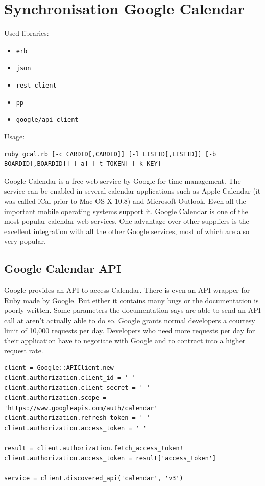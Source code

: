 \section{Synchronisation Google Calendar}
Used libraries:
\begin{itemize}
	\item \texttt{erb}
	\item \texttt{json}
	\item \texttt{rest\_client}
	\item \texttt{pp}
	\item \texttt{google/api\_client}
\end{itemize}

Usage:
\begin{lstlisting}[aboveskip=1\baselineskip, style=bash, caption=\texttt{gcal.rb} usage., label=listing025]
ruby gcal.rb [-c CARDID[,CARDID]] [-l LISTID[,LISTID]] [-b BOARDID[,BOARDID]] [-a] [-t TOKEN] [-k KEY]
\end{lstlisting}

Google Calendar is a free web service by Google for time-management. The service can be enabled in several calendar applications such as Apple Calendar (it was called iCal prior to Mac OS X 10.8) and Microsoft Outlook. Even all the important mobile operating systems support it. Google Calendar is one of the most popular calendar web services. One advantage over other suppliers is the excellent integration with all the other Google services, most of which are also very popular.

\subsection{Google Calendar API}
Google provides an API to access Calendar. There is even an API wrapper for Ruby made by Google. But either it contains many bugs or the documentation is poorly written. Some parameters the documentation says are able to send an API call at aren't actually able to do so. Google grants normal developers a courtesy limit of 10,000 requests per day. Developers who need more requests per day for their application have to negotiate with Google and to contract into a higher request rate.

\begin{lstlisting}[aboveskip=1\baselineskip, caption=Initialisation of the Google Calendar API connection., label=listing017]
client = Google::APIClient.new
client.authorization.client_id = ' '
client.authorization.client_secret = ' '
client.authorization.scope = 'https://www.googleapis.com/auth/calendar'
client.authorization.refresh_token = ' '
client.authorization.access_token = ' '

result = client.authorization.fetch_access_token!
client.authorization.access_token = result['access_token']

service = client.discovered_api('calendar', 'v3')
\end{lstlisting}

